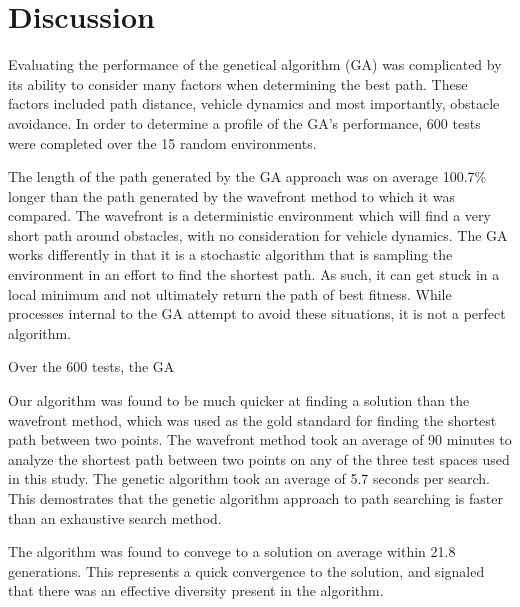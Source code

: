	
	
\section{Discussion}

Evaluating the performance of the genetical algorithm (GA) was complicated by its ability to consider many factors when determining the best path. These factors included path distance, vehicle dynamics and most importantly, obstacle avoidance. In order to determine a profile of the GA's performance, 600 tests were completed over the 15 random environments.

The length of the path generated by the GA approach was on average 100.7\% longer than the path generated by the wavefront method to which it was compared. The wavefront is a deterministic environment which will find a very short path around obstacles, with no consideration for vehicle dynamics. The GA works differently in that it is a stochastic algorithm that is sampling the environment in an effort to find the shortest path. As such, it can get stuck in a local minimum and not ultimately return the path of best fitness. While processes internal to the GA attempt to avoid these situations, it is not a perfect algorithm.

Over the 600 tests, the GA 

Our algorithm was found to be much quicker at finding a solution than the wavefront method, which was used as the gold standard for finding the shortest path between two points. The wavefront method took an average of 90 minutes to analyze the shortest path between two points on any of the three test spaces used in this study. The genetic algorithm took an average of 5.7 seconds per search. This demostrates that the genetic algorithm approach to path searching is faster than an exhaustive search method.

The algorithm was found to convege to a solution on average within 21.8 generations. This represents a quick convergence to the solution, and signaled that there was an effective diversity present in the algorithm.

